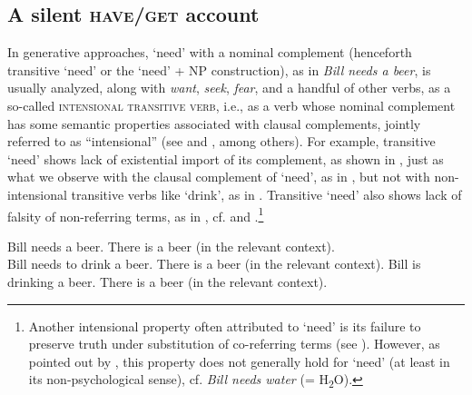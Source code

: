 \documentclass[output=paper,colorlinks,citecolor=brown]{langscibook}
\begin{document}
\subsection{A silent \textsc{have/get} account}\label{section-silent-have}

In generative approaches, `need' with a nominal complement (henceforth transitive `need' or the `need' + NP construction), as in \textit{Bill needs a beer}, is usually analyzed, along with \textit{want}, \textit{seek}, \textit{fear}, and a handful of other verbs, as a so-called \textsc{intensional transitive verb}, i.e., as a verb whose nominal complement has some semantic properties associated with clausal complements, jointly referred to as ``intensional'' (see \citealt{denDikken.Larson.Ludlow2018} and \citealt{Schwarz2006}, among others). For example, transitive `need' shows lack of existential import of its complement, as shown in , just as what we observe with the clausal complement of `need', as in , but not with non-intensional transitive verbs like `drink', as in . Transitive `need' also shows lack of falsity of non-referring terms, as in , cf.  and .\footnote{ Another intensional property often attributed to `need' is its failure to preserve truth under substitution of co-referring terms (see \citealt{denDikken.Larson.Ludlow2018,Harves2008}). However, as pointed out by \citet{Forbes2020}, this property does not generally hold for `need' (at least in its non-psychological sense), cf. \textit{Bill needs water} (= H\textsubscript{2}O).}

    \largerpage[-2] %

\ea
\ea Bill needs a beer. {\nRightarrow} There is a beer (in the relevant context).\label{need-intensional}\\ \hfill \citep[259]{Schwarz2006}
\ex Bill needs to drink a beer. {\nRightarrow} There is a beer (in the relevant context).\label{need-infinitival}
\ex Bill is drinking a beer. {\Rightarrow} There is a beer  (in the relevant context).\label{non-intensional}
\z\z

\end{document}
